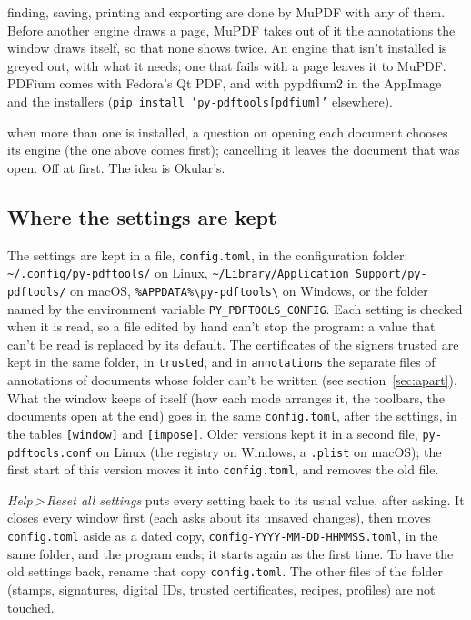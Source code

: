 \documentclass[12pt,
              article,
              oneside
              ]{memoir}
\newcommand*{\menu}[1]{\textit{#1}}
\newcommand*{\then}{\,>\,}
\begin{document}
\begin{description}
  finding, saving, printing and exporting are done by MuPDF with any of
  them. Before another engine draws a page, MuPDF takes out of it the
  annotations the window draws itself, so that none shows twice. An
  engine that isn't installed is greyed out, with what it needs; one that
  fails with a page leaves it to MuPDF. PDFium comes with Fedora's Qt PDF,
  and with pypdfium2 in the AppImage and the installers
  (\texttt{pip install 'py-pdftools[pdfium]'} elsewhere).
\item[Ask which engine when opening a document] when more than one is
  installed, a question on opening each document chooses its engine (the
  one above comes first); cancelling it leaves the document that was open.
  Off at first. The idea is Okular's.
\end{description}

\subsection{Where the settings are kept}
\label{sec:files-kept}

%
The settings are kept in a file, \texttt{config.toml}, in the configuration
folder: \texttt{\textasciitilde/.config/py-pdftools/} on Linux,
\texttt{\textasciitilde/Library/Application Support/py-pdftools/} on macOS,
\texttt{\%APPDATA\%\textbackslash py-pdftools\textbackslash} on Windows, or
the folder named by the environment variable \texttt{PY\_PDFTOOLS\_CONFIG}.
Each setting is checked when it is read, so a file edited by hand can't
stop the program: a value that can't be read is replaced by its default.
The certificates of the signers trusted are kept in the same folder, in
\texttt{trusted}, and in \texttt{annotations} the separate files of
annotations of documents whose folder can't be written (see
section~\ref{sec:apart}). What the window keeps of itself (how each mode arranges
it, the toolbars, the documents open at the end) goes in the same
\texttt{config.toml}, after the settings, in the tables
\texttt{[window]} and \texttt{[impose]}. Older versions kept it in a second
file, \texttt{py-pdftools.conf} on Linux (the registry on Windows, a
\texttt{.plist} on macOS); the first start of this version moves it into
\texttt{config.toml}, and removes the old file.

%
\menu{Help\then Reset all settings} puts every setting back to its usual
value, after asking. It closes every window first (each asks about its
unsaved changes), then moves \texttt{config.toml} aside as a dated copy,
\texttt{config-YYYY-MM-DD-HHMMSS.toml}, in the same folder, and the
program ends; it starts again as the first time. To have the old settings
back, rename that copy \texttt{config.toml}. The other files of the
folder (stamps, signatures, digital IDs, trusted certificates, recipes,
profiles) are not touched.
\end{document}
